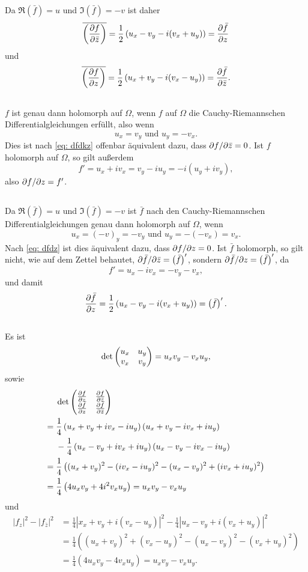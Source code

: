 \documentclass[a4paper,10pt]{article}
\begin{document}
Da $\Re\left(\bar{f}\right) = u$ und $\Im\left(\bar{f}\right) = -v$ ist daher
\[
 \overline{\left(\frac{\partial f}{\partial \bar{z}}\right)}
 = \frac{1}{2}\left( u_x-v_y - i(v_x+u_y) \right)
 = \frac{\partial \bar{f}}{\partial z}
\]
und
\[
 \overline{\left(\frac{\partial f}{\partial z}\right)}
 = \frac{1}{2}\left( u_x+v_y - i(v_x-u_y) \right)
 = \frac{\partial \bar{f}}{\partial \bar{z}}.
\]


\subsection{}
$f$ ist genau dann holomorph auf $\Omega$, wenn $f$ auf $\Omega$ die Cauchy-Riemannschen Differentialgleichungen erfüllt, also wenn
\[
 u_x = v_y \text{ und } u_y = -v_x.
\]
Dies ist nach \eqref{eq: dfdkz} offenbar äquivalent dazu, dass $\partial f / \partial \bar{z} = 0$. Ist $f$ holomorph auf $\Omega$, so gilt außerdem
\[
 f' = u_x + iv_x = v_y - iu_y = -i(u_y + iv_y),
\]
also $\partial f / \partial z = f'$.


\subsection{}
Da $\Re\left(\bar{f}\right) = u$ und $\Im\left(\bar{f}\right) = -v$ ist $\bar{f}$ nach den Cauchy-Riemannschen Differentialgleichungen genau dann holomorph auf $\Omega$, wenn
\[
 u_x = (-v)_y = -v_y \text{ und } u_y = -(-v_x) = v_x.
\]
Nach \eqref{eq: dfdz} ist dies äquivalent dazu, dass $\partial f / \partial z = 0$. Ist $\bar{f}$ holomorph, so gilt nicht, wie auf dem Zettel behautet, $\partial \bar{f} / \partial \bar{z} = \left(\bar{f}\right)'$, sondern $\partial \bar{f} / \partial z = \left(\bar{f}\right)'$, da
\[
 f' = u_x - i v_x = -v_y -v_x,
\]
und damit
\[
 \frac{\partial \bar{f}}{\partial z}
 = \frac{1}{2}\left( u_x-v_y - i(v_x+u_y) \right)
 = \left(\bar{f}\right)'.
\]


\subsection{}
Es ist
\[
 \det \begin{pmatrix}u_x & u_y \\ v_x & v_y\end{pmatrix} = u_x v_y - v_x u_y,
\]
sowie
\begin{align*}
 &\; \det \begin{pmatrix}\frac{\partial f}{\partial z} & \frac{\partial f}{\partial \bar{z}} \\ \frac{\partial \bar{f}}{\partial z} & \frac{\partial \bar{f}}{\partial \bar{z}}\end{pmatrix} \\
 =&\; \frac{1}{4}\left( u_x + v_y + iv_x - iu_y \right)\left( u_x + v_y - iv_x + iu_y \right) \\
  &\; -\frac{1}{4}\left( u_x - v_y + iv_x + iu_y \right)\left( u_x - v_y -iv_x - iu_y \right) \\
 =&\; \frac{1}{4}\left( (u_x+v_y)^2 - (iv_x-iu_y)^2 - (u_x-v_y)^2 + (iv_x+iu_y)^2 \right) \\
 =&\; \frac{1}{4}\left( 4 u_x v_y + 4 i^2 v_x u_y \right)
 = u_x v_y - v_x u_y
\end{align*}
und
\begin{align*}
 |f_z|^2 - |f_{\bar{z}}|^2
 &= \frac{1}{4} \left|x_x+v_y+i(v_x-u_y)\right|^2 - \frac{1}{4} \left|u_x-v_y+i(v_x+u_y)\right|^2 \\
 &= \frac{1}{4} \left( (u_x+v_y)^2 + (v_x-u_y)^2 - (u_x-v_y)^2 - (v_x+u_y)^2 \right) \\
 &= \frac{1}{4} \left( 4 u_x v_y - 4 v_x u_y \right)
 = u_x v_y - v_x u_y.
\end{align*}
\end{document}
